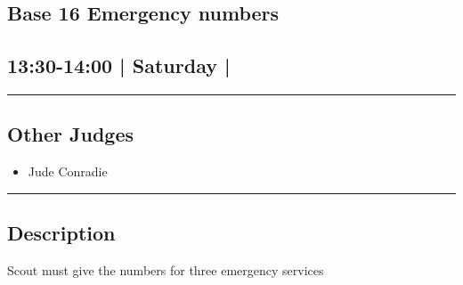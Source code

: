 \documentclass[10pt, A5]{article}
\begin{document}
	

		\begin{framed}
			\begin{minipage}{\textwidth}

			\setcounter{section}{43}
							\section{\faStar \: Base 16 \faStar \: Emergency numbers}
						
			\subsection*{13:30-14:00 | Saturday | }

			\vspace{0.25cm}
			\hrule
			\vspace{0.25cm}


			\subsection*{Other Judges}
							

				\begin{multicols}{2}

			\begin{itemize}
											\item Jude Conradie
								\end{itemize}

			\vfill\null
			\columnbreak

			\begin{itemize}
								\end{itemize}

			\vfill\null

			\end{multicols}

			\vspace{0.25cm}
			\hrule
			\vspace{0.25cm}

			\begin{minipage}{\textwidth}
			\subsection*{\faListAlt \: Description}
			Scout must give the numbers for three emergency services
			\end{minipage}


	\end{minipage}
	\end{framed}
\end{document}
